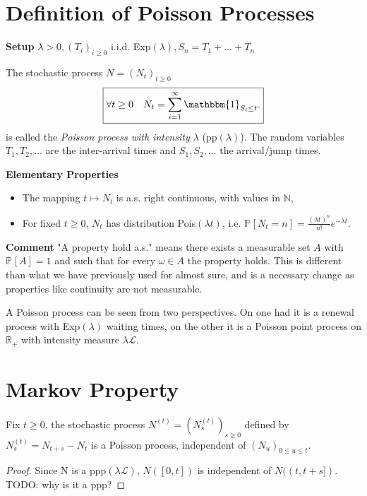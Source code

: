 \section{Definition of Poisson Processes}
\textbf{Setup}  $\lambda > 0, (T_i)_{i\geq 0}$ i.i.d. Exp$(\lambda ), S_n = T_1+ \ldots +T_n$

\begin{defn}
	The stochastic process $N=(N_t)_{t\geq 0}$
	\begin{align}
		\boxed{\forall t\geq 0 \quad N_t = \sum_{i=1}^{\infty} \mathbbm{1}_{S_i \leq t}.}
	\end{align}
	is called the \emph{Poisson process with intensity $\lambda$} (pp$(\lambda)$). The random variables $T_1,T_2, \ldots $ are the inter-arrival times and  $S_1,S_2, \ldots $ the arrival/jump times.
\end{defn}
\noindent
\textbf{Elementary Properties}
\begin{itemize}
	\item The mapping $t \mapsto N_t$ is a.s. right continuous, with values in $\mathbb{N}$,
	\item For fixed $t\geq 0$, $N_t$ has distribution Pois$(\lambda t)$, i.e. $\mathbb{P}_{} \left[ N_t = n \right] = \frac{(\lambda t)^n}{n!}e^{- \lambda  t}$.
\end{itemize}

{\color{blue}
\noindent \textbf{Comment} "A property hold a.s." means there exists a measurable set $A$ with $\mathbb{P}_{} \left[ A \right] =1$ and such that for every $\omega \in A$ the property holds. This is different than what we have previously used for almost sure, and is a necessary change as properties like continuity are not measurable.

\begin{rmk}[]
	A Poisson process can be seen from two perspectives. On one had it is a renewal process with Exp$(\lambda)$ waiting times, on the other it is a Poisson point process on $\mathbb{R}_+$ with intensity measure $\lambda \mathcal{L}$.
\end{rmk}

}

\section{Markov Property}
\begin{theorem}
	Fix $t\geq 0$, the stochastic process $N^{(t)}=(N^{(t)}_{s})_{s \geq 0}$ defined by $N^{(t)}_s = N_{t+s}-N_{t}$ is a Poisson process, independent of $(N_u)_{0 \leq u \leq t}$.
\end{theorem}
{\color{blue}
\begin{proof}
	Since N is a ppp$(\lambda \mathcal{L})$, $N([0,t])$ is independent of $N((t,t+s])$. TODO: why is it a ppp?	
\end{proof}}


